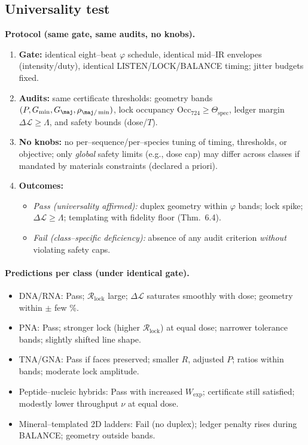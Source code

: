 \documentclass[11pt]{article}
\begin{document}
\subsection{Universality test}\label{sec:uni-test}
\textbf{Protocol (same gate, same audits, no knobs).}
\begin{enumerate}
\item \textbf{Gate:} identical eight–beat $\varphi$ schedule, identical mid–IR envelopes (intensity/duty), identical LISTEN/LOCK/BALANCE timing; jitter budgets fixed.
\item \textbf{Audits:} same certificate thresholds: geometry bands $(P,G_{\min},G_{\maj},\rho_{\maj/\min})$, lock occupancy $\mathrm{Occ}_{724}\ge \Theta_{\mathrm{spec}}$, ledger margin $\Delta\mathcal{L}\ge \Lambda$, and safety bounds (dose/$T$).
\item \textbf{No knobs:} no per–sequence/per–species tuning of timing, thresholds, or objective; only \emph{global} safety limits (e.g., dose cap) may differ across classes if mandated by materials constraints (declared a priori).
\item \textbf{Outcomes:}
\begin{itemize}
\item \emph{Pass (universality affirmed):} duplex geometry within $\varphi$ bands; lock spike; $\Delta\mathcal{L}\ge\Lambda$; templating with fidelity floor (Thm.~6.4).
\item \emph{Fail (class–specific deficiency):} absence of any audit criterion \emph{without} violating safety caps.
\end{itemize}
\end{enumerate}

\paragraph{Predictions per class (under identical gate).}
\begin{itemize}
\item DNA/RNA: Pass; $\mathcal{R}_{\mathrm{lock}}$ large; $\Delta\mathcal{L}$ saturates smoothly with dose; geometry within $\pm$ few \%.
\item PNA: Pass; stronger lock (higher $\mathcal{R}_{\mathrm{lock}}$) at equal dose; narrower tolerance bands; slightly shifted line shape.
\item TNA/GNA: Pass if faces preserved; smaller $R$, adjusted $P$; ratios within bands; moderate lock amplitude.
\item Peptide–nucleic hybrids: Pass with increased $W_{\mathrm{exp}}$; certificate still satisfied; modestly lower throughput $\nu$ at equal dose.
\item Mineral–templated 2D ladders: Fail (no duplex); ledger penalty rises during BALANCE; geometry outside bands.
\end{itemize}
\end{document}
